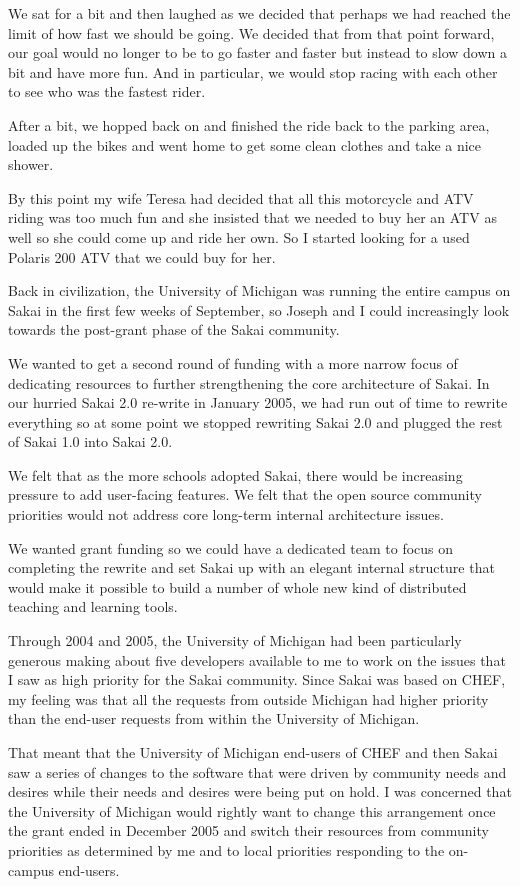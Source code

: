 \documentclass[12pt]{book}
\begin{document}
We sat for a bit and then laughed as we
decided that perhaps we had reached the limit
of how fast we should be going.  We decided
that from that point forward, our goal would no
longer to be to go faster and faster but instead
to slow down a bit and have more fun.  And in
particular, we would stop racing with each other
to see who was the fastest rider.

After a bit, we hopped back on and finished
the ride back to the parking area, loaded
up the bikes and went home to get some clean
clothes and take a nice shower.

By this point my wife Teresa had decided that
all this motorcycle and ATV riding was too much
fun and she insisted that we needed to buy
her an ATV as well so she could come up and
ride her own.  So I started looking for a used
Polaris 200 ATV that we could buy for her.

Back in civilization, the University of Michigan
was running the entire campus on Sakai in the first
few weeks of September, so Joseph and I could
increasingly look towards the post-grant phase
of the Sakai community.

We wanted to get a second round of funding
with a more narrow focus of dedicating resources to further
strengthening the core architecture of Sakai.   In our
hurried Sakai 2.0 re-write in January 2005, we had run out
of time to rewrite everything so at some point we
stopped rewriting Sakai 2.0 and plugged
the rest of Sakai 1.0 into Sakai 2.0.

We felt that as the more schools adopted Sakai, there
would be increasing pressure to add user-facing features.
We felt that the open source community priorities would
not address core long-term internal architecture issues.

We wanted grant funding so we could have a dedicated
team to focus on completing the rewrite and set Sakai
up with an elegant internal
structure that would make it possible to build a number of
whole new kind of distributed teaching and learning tools.

Through 2004 and 2005, the University of Michigan had been
particularly generous making about five developers available
to me to work on the issues that I saw as high priority
for the Sakai community.  Since Sakai was based on CHEF,
my feeling was that all the requests from outside Michigan
had higher priority than the end-user requests from
within the University of Michigan.

That meant that the University of Michigan end-users of
CHEF and then Sakai saw a series of changes to the software
that were driven by community needs and desires while
their needs and desires were being put on hold.
I was concerned that the University of Michigan would
rightly want to change this arrangement once the grant
ended in December 2005 and switch their resources
from community priorities as determined by me and to local
priorities responding to the on-campus end-users.
\end{document}
